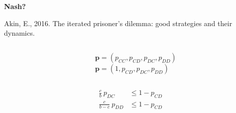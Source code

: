 \documentclass{beamer}
\begin{document}
\begin{frame}
    \centering
    
\end{frame}

\begin{frame}
    \centering
    
    \pause
    \hspace{8cm} \LARGE{\textcolor{solarizedRed}{\textbf{Nash?}}}
\end{frame}


\begin{frame}
    \begin{center}
        Akin, E., 2016. The iterated prisoner's dilemma: good strategies and their dynamics.
        \vspace{1cm}
        \begin{columns}
            \centering
            \begin{column}{.5\textwidth}
            \centering
        
            \end{column}
        \begin{column}{.6\textwidth}
        \textcolor{blue!40!white}{\Large{
        $\mathbf{p} = (p_{CC}, p_{CD}, p_{DC}, p_{DD})$}} \\ \vspace{1cm}
        \pause
        \textcolor{blue!40!white}{\Large{
        $\mathbf{p} = (1, p_{CD}, p_{DC}, p_{DD})$}}

        \end{column}
    \end{columns}
    \end{center}
\end{frame}

\begin{frame}
    \begin{center}
        \Large{
        \textbf{
        \begin{align}
            \frac{c}{b} \ p_{DC} & \leq 1 - p_{CD} \\[2em]
            \frac{c}{b - c} \ p_{DD} & \leq 1 - p_{CD}
        \end{align}}}
    \end{center}
\end{frame}
\end{document}
